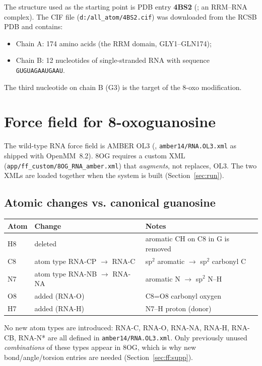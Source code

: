 \documentclass[11pt,a4paper]{article}
\begin{document}
The structure used as the starting point is PDB entry \textbf{4BS2}
(\citealt{Lukavsky2013}; an RRM--RNA complex). The CIF file
(\texttt{d:/all\_atom/4BS2.cif}) was downloaded from the RCSB PDB and
contains:

\begin{itemize}[leftmargin=*]
\item Chain A: 174 amino acids (the RRM domain, GLY1--GLN174);
\item Chain B: 12 nucleotides of single-stranded RNA with sequence
\texttt{GUGUAGAAUGAAU}.
\end{itemize}

The third nucleotide on chain B (G3) is the target of the 8-oxo
modification.

\section{Force field for 8-oxoguanosine}
\label{sec:ff}

The wild-type RNA force field is AMBER OL3 (\citealt{Perez2007},
\texttt{amber14/RNA.OL3.xml} as shipped with OpenMM~8.2). 8OG requires
a custom XML (\texttt{app/ff\_custom/8OG\_RNA\_amber.xml}) that
\emph{augments}, not replaces, OL3. The two XMLs are loaded together
when the system is built (Section~\ref{sec:run}).

\subsection{Atomic changes vs. canonical guanosine}

\begin{tabular}{lll}
\toprule
Atom & Change & Notes \\
\midrule
H8 & deleted & aromatic CH on C8 in G is removed \\
C8 & atom type RNA-CP $\rightarrow$ RNA-C & sp$^{2}$ aromatic $\rightarrow$ sp$^{2}$ carbonyl C \\
N7 & atom type RNA-NB $\rightarrow$ RNA-NA & aromatic N $\rightarrow$ sp$^{2}$ N--H \\
O8 & added (RNA-O) & C8=O8 carbonyl oxygen \\
H7 & added (RNA-H) & N7--H proton (donor) \\
\bottomrule
\end{tabular}

No new atom types are introduced: RNA-C, RNA-O, RNA-NA, RNA-H, RNA-CB,
RNA-N* are all defined in \texttt{amber14/RNA.OL3.xml}. Only previously
unused \emph{combinations} of these types appear in 8OG, which is why
new bond/angle/torsion entries are needed (Section~\ref{sec:ff:supp}).
\end{document}
